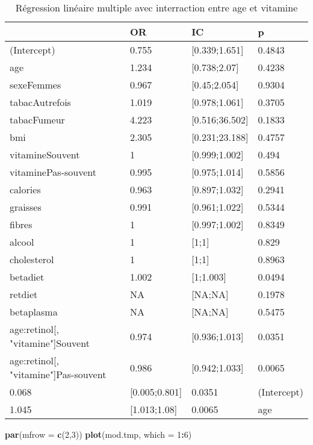 \documentclass[]{article}
\newenvironment{Shaded}{\begin{snugshade}}{\end{snugshade}}
\newcommand{\KeywordTok}[1]{\textcolor[rgb]{0.13,0.29,0.53}{\textbf{#1}}}
\newcommand{\DataTypeTok}[1]{\textcolor[rgb]{0.13,0.29,0.53}{#1}}
\newcommand{\DecValTok}[1]{\textcolor[rgb]{0.00,0.00,0.81}{#1}}
\newcommand{\OperatorTok}[1]{\textcolor[rgb]{0.81,0.36,0.00}{\textbf{#1}}}
\newcommand{\NormalTok}[1]{#1}
\begin{document}
\begin{table}

\caption{\label{tab:unnamed-chunk-83}Régression linéaire multiple avec interraction entre age et vitamine}
\centering
\begin{tabular}[t]{l|l|l|l}
\hline
  & OR & IC & p\\
\hline
\rowcolor[HTML]{BBD2E1}  (Intercept) & 0.755 & [0.339;1.651] & 0.4843\\
\hline
age & 1.234 & [0.738;2.07] & 0.4238\\
\hline
\rowcolor[HTML]{BBD2E1}  sexeFemmes & 0.967 & [0.45;2.054] & 0.9304\\
\hline
tabacAutrefois & 1.019 & [0.978;1.061] & 0.3705\\
\hline
\rowcolor[HTML]{BBD2E1}  tabacFumeur & 4.223 & [0.516;36.502] & 0.1833\\
\hline
bmi & 2.305 & [0.231;23.188] & 0.4757\\
\hline
\rowcolor[HTML]{BBD2E1}  vitamineSouvent & 1 & [0.999;1.002] & 0.494\\
\hline
vitaminePas-souvent & 0.995 & [0.975;1.014] & 0.5856\\
\hline
\rowcolor[HTML]{BBD2E1}  calories & 0.963 & [0.897;1.032] & 0.2941\\
\hline
graisses & 0.991 & [0.961;1.022] & 0.5344\\
\hline
\rowcolor[HTML]{BBD2E1}  fibres & 1 & [0.997;1.002] & 0.8349\\
\hline
alcool & 1 & [1;1] & 0.829\\
\hline
\rowcolor[HTML]{BBD2E1}  cholesterol & 1 & [1;1] & 0.8963\\
\hline
betadiet & 1.002 & [1;1.003] & 0.0494\\
\hline
\rowcolor[HTML]{BBD2E1}  retdiet & NA & [NA;NA] & 0.1978\\
\hline
betaplasma & NA & [NA;NA] & 0.5475\\
\hline
\rowcolor[HTML]{BBD2E1}  age:retinol[, "vitamine"]Souvent & 0.974 & [0.936;1.013] & 0.0351\\
\hline
age:retinol[, "vitamine"]Pas-souvent & 0.986 & [0.942;1.033] & 0.0065\\
\hline
\rowcolor[HTML]{BBD2E1}  0.068 & [0.005;0.801] & 0.0351 & (Intercept)\\
\hline
1.045 & [1.013;1.08] & 0.0065 & age\\
\hline
\end{tabular}
\end{table}

\begin{Shaded}
\begin{Highlighting}[]
\KeywordTok{par}\NormalTok{(}\DataTypeTok{mfrow =} \KeywordTok{c}\NormalTok{(}\DecValTok{2}\NormalTok{,}\DecValTok{3}\NormalTok{))}
\KeywordTok{plot}\NormalTok{(mod.tmp, }\DataTypeTok{which =} \DecValTok{1}\OperatorTok{:}\DecValTok{6}\NormalTok{)}
\end{Highlighting}
\end{Shaded}
\end{document}
